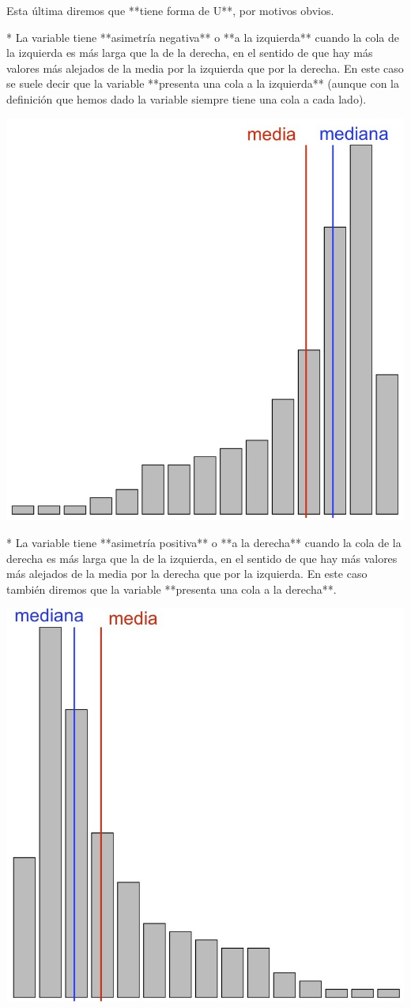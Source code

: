 \documentclass[
]{book}
\theoremstyle{definition}
\theoremstyle{definition}
\theoremstyle{definition}
\theoremstyle{definition}
\theoremstyle{remark}
\begin{document}
    Esta última diremos que **tiene forma de U**, por motivos obvios.

* La variable tiene **asimetría negativa** o **a la izquierda** cuando la cola de la izquierda es más larga que la de la derecha, en el sentido de que hay más valores más alejados de la media por la izquierda que por la derecha.  En este caso se suele decir que la variable  **presenta una cola a la izquierda** (aunque con la definición que hemos dado la variable siempre tiene una cola a cada lado).



\begin{center}\includegraphics[width=0.6\linewidth]{INREMDN_files/figure-html/asimdreta} \end{center}

* La variable tiene **asimetría positiva** o **a la derecha** cuando la cola de la derecha es más larga que la de la izquierda, en el sentido de que hay más valores más alejados de la media por la derecha que por la izquierda. En este caso también diremos que la variable **presenta una cola a la derecha**.



\begin{center}\includegraphics[width=0.6\linewidth]{INREMDN_files/figure-html/asimesquerra} \end{center}
\end{document}
